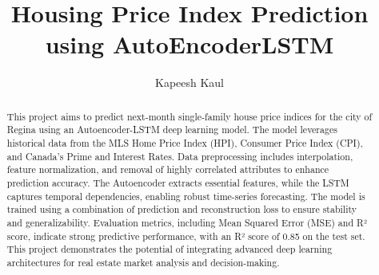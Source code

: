 \documentclass[a4paper,12pt]{article}
\title{Housing Price Index Prediction using AutoEncoderLSTM}
\author{
    Kapeesh Kaul
}
\date{}
\begin{document}
    \maketitle

    \begin{center}
        \begin{abstract}
            This project aims to predict next-month single-family house price indices for the city of Regina using an Autoencoder-LSTM deep learning model. The model leverages historical data from the MLS Home Price Index (HPI), Consumer Price Index (CPI), and Canada's Prime and Interest Rates. Data preprocessing includes interpolation, feature normalization, and removal of highly correlated attributes to enhance prediction accuracy. The Autoencoder extracts essential features, while the LSTM captures temporal dependencies, enabling robust time-series forecasting. The model is trained using a combination of prediction and reconstruction loss to ensure stability and generalizability. Evaluation metrics, including Mean Squared Error (MSE) and R² score, indicate strong predictive performance, with an R² score of 0.85 on the test set. This project demonstrates the potential of integrating advanced deep learning architectures for real estate market analysis and decision-making.
        \end{abstract}
    \end{center}

    
    
    
    
    
    
    
    
\end{document}
